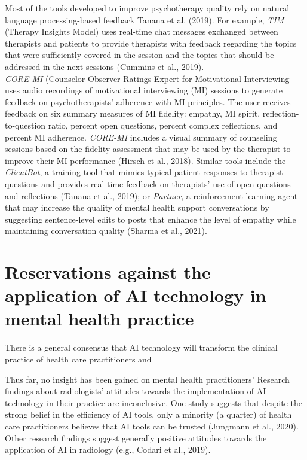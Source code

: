 \documentclass[
  man]{apa7}
\begin{document}
Most of the tools developed to improve psychotherapy quality rely on natural language processing-based feedback Tanana et al. (2019).
For example, \emph{TIM} (Therapy Insights Model) uses real-time chat messages exchanged between therapists and patients to provide therapists with feedback regarding the topics that were sufficiently covered in the session and the topics that should be addressed in the next sessions (Cummins et al., 2019).\\
\emph{CORE-MI} (Counselor Observer Ratings Expert for Motivational Interviewing uses audio recordings of motivational interviewing (MI) sessions to generate feedback on psychotherapists' adherence with MI principles.
The user receives feedback on six summary measures of MI fidelity: empathy, MI spirit, reflection-to-question ratio, percent open questions, percent complex reflections, and percent MI adherence.
\emph{CORE-MI} includes a visual summary of counseling sessions based on the fidelity assessment that may be used by the therapist to improve their MI performance (Hirsch et al., 2018).
Similar tools include the \emph{ClientBot}, a training tool that mimics typical patient responses to therapist questions and provides real-time feedback on therapists' use of open questions and reflections (Tanana et al., 2019); or \emph{Partner}, a reinforcement learning agent that may increase the quality of mental health support conversations by suggesting sentence-level edits to posts that enhance the level of empathy while maintaining conversation quality (Sharma et al., 2021).

\hypertarget{reservations-against-the-application-of-ai-technology-in-mental-health-practice}{%
\section{Reservations against the application of AI technology in mental health practice}\label{reservations-against-the-application-of-ai-technology-in-mental-health-practice}}

There is a general consensus that AI technology will transform the clinical practice of health care practitioners and

Thus far, no insight has been gained on mental health practitioners'
Research findings about radiologists' attitudes towards the implementation of AI technology in their practice are inconclusive. One study suggests that despite the strong belief in the efficiency of AI tools, only a minority (a quarter) of health care practitioners believes that AI tools can be trusted (Jungmann et al., 2020). Other research findings suggest generally positive attitudes towards the application of AI in radiology (e.g., Codari et al., 2019).
\end{document}
